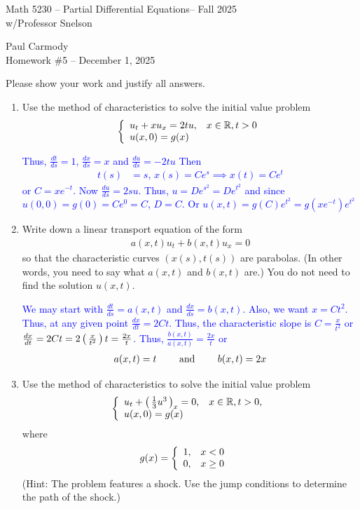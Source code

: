 \documentclass[10pt,a4paper]{report}
\newcommand{\CLASSNAME}{Math 5230 -- Partial Differential Equations}
\newcommand{\STUDENTNAME}{Paul Carmody}
\newcommand{\ASSIGNMENT}{Homework \#5 }
\newcommand{\DUEDATE}{December 1, 2025}
\newcommand{\SEMESTER}{Fall 2025}
\newcommand{\BLUE}[1]{\textcolor{blue}{#1}}
\begin{document}
\begin{center}
	\Large{\CLASSNAME -- \SEMESTER} \\
	\large{ w/Professor Snelson}
\end{center}
\begin{center}
	\STUDENTNAME \\
	\ASSIGNMENT -- \DUEDATE\\
\end{center} 

\noindent Please show your work and justify all answers.

\begin{enumerate}

\item Use the method of characteristics to solve the initial value problem 
\begin{align*}
	\left \{ \begin{array}{ll} u_t+xu_x = 2tu, & x \in \mathbb{R}, t>0\\ u(x,0)=g(x) \end{array} \right .
\end{align*}

\BLUE{Thus, $\frac{dt}{ds}=1$, $\frac{dx}{ds}=x$ and $\frac{du}{ds}=-2t u$  Then
\begin{align*}
	t(s) &= s,\, x(s)=Ce^s \implies x(t)= Ce^t
\end{align*}or $C = xe^{-t}$.  Now $\frac{du}{ds} = 2su$.  Thus, $u = De^{s^2}=De^{t^2}$ and since $u(0,0) = g(0) = Ce^0 = C$, $D=C$.  Or $u(x,t) = g(C)e^{t^2} = g(xe^{-t})e^{t^2}$
}

\item Write down a linear transport equation of the form
\begin{align*}
	a(x,t)u_t+b(x,t)u_x = 0
\end{align*}so that the characteristic curves $(x(s), t(s))$ are parabolas.  (In other words, you need to say what $a(x,t)$ and $b(x,t)$ are.)  You do not need to find the solution $u(x,t)$.

\BLUE{We may start with $\frac{dt}{ds} = a(x,t)$ and $\frac{dx}{ds}=b(x,t)$.  Also, we want $x = Ct^2$.  Thus, at any given point $\frac{dx}{dt}=2Ct$.  Thus, the characteristic slope is $C = \frac{x}{t^2}$ or $\frac{dx}{dt}= 2Ct=2\left (\, \frac{x}{t^2} \,\right )t=\frac{2x}{t}$.  Thus, $\frac{b(x,t)}{a(x,t)}=\frac{2x}{t}$ or 
\begin{align*}
	a(x,t) &= t & \quad &\text{ and } & \quad b(x,t) = 2x
\end{align*}
}

\item Use the method of characteristics to solve the initial value problem
\begin{align*}
	\left \{ \begin{array}{ll} u_t+\left (\, \frac{1}{3}u^3 \,\right )_x = 0, & x\in \mathbb{R}, t>0,\\ u(x,0)=g(x) \end{array} \right .
\end{align*}where
\begin{align*}
	g(x) &= \left \{ \begin{array}{ll} 1,&x<0\\ 0,&x\ge 0 \end{array} \right .
\end{align*}(Hint: The problem features a shock.  Use the jump conditions to determine the path of the shock.)


\end{enumerate}
\end{document}
